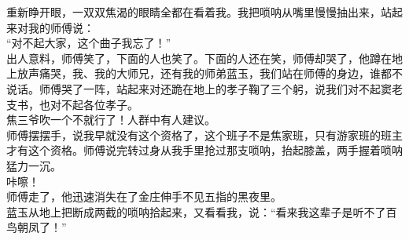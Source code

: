 重新睁开眼，一双双焦渴的眼睛全都在看着我。我把唢呐从嘴里慢慢抽出来，站起来对我的师傅说：\\

“对不起大家，这个曲子我忘了！”\\

出人意料，师傅笑了，下面的人也笑了。下面的人还在笑，师傅却哭了，他蹲在地上放声痛哭，我、我的大师兄，还有我的师弟蓝玉，我们站在师傅的身边，谁都不说话。师傅哭了一阵，站起来对还跪在地上的孝子鞠了三个躬，说我们对不起窦老支书，也对不起各位孝子。\\

焦三爷吹一个不就行了！人群中有人建议。\\

师傅摆摆手，说我早就没有这个资格了，这个班子不是焦家班，只有游家班的班主才有这个资格。师傅说完转过身从我手里抢过那支唢呐，抬起膝盖，两手握着唢呐猛力一沉。\\

咔嚓！\\

师傅走了，他迅速消失在了金庄伸手不见五指的黑夜里。\\

蓝玉从地上把断成两截的唢呐拾起来，又看看我，说：“看来我这辈子是听不了百鸟朝凤了！”\\
